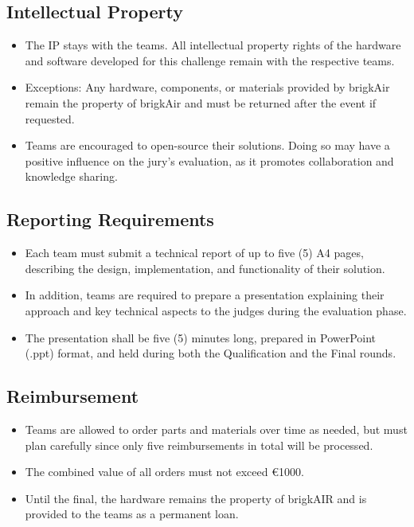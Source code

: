 \subsection{Intellectual Property}
\begin{itemize}
	\item{The IP stays with the teams. All intellectual property rights of the hardware and software developed for this challenge remain with the respective teams.}
	\item{Exceptions: Any hardware, components, or materials provided by brigkAir remain the property of brigkAir and must be returned after the event if requested.}
	\item{Teams are encouraged to open-source their solutions. Doing so may have a positive influence on the jury's evaluation, as it promotes collaboration and knowledge sharing.}
\end{itemize}

\subsection{Reporting Requirements}
\begin{itemize}
	\item{Each team must submit a technical report of up to five (5) A4 pages, describing the design, implementation, and functionality of their solution.}
	\item{In addition, teams are required to prepare a presentation explaining their approach and key technical aspects to the judges during the evaluation phase.}
	\item{The presentation shall be five (5) minutes long, prepared in PowerPoint (.ppt) format, and held during both the Qualification and the Final rounds.}
\end{itemize}

\subsection{Reimbursement}
\begin{itemize}
	\item{Teams are allowed to order parts and materials over time as needed, but must plan carefully since only five reimbursements in total will be processed.}
	\item{The combined value of all orders must not exceed €1000.}
	\item{Until the final, the hardware remains the property of brigkAIR and is provided to the teams as a permanent loan.}
\end{itemize}
